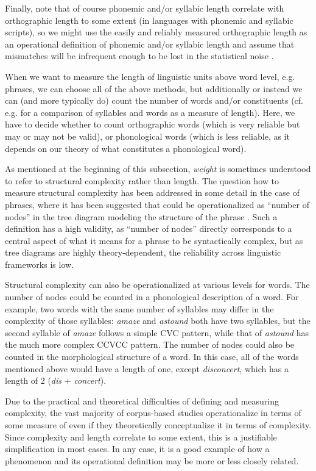 Finally, note that of course phonemic and/or syllabic length correlate with orthographic length to some extent (in languages with phonemic and syllabic scripts), so we might use the easily and reliably measured orthographic length as an operational definition of phonemic and/or syllabic length and assume that mismatches will be infrequent enough to be lost in the statistical noise \citep[cf.][]{wulff_multifactorial_2003}.

When we want to measure the length of linguistic units above word level, e.g. phrases, we can choose all of the above methods, but additionally or instead we can (and more typically do) count the number of words and/or constituents (cf. e.g. \citet{gries_multifactorial_2003} for a comparison of syllables and words as a measure of length). Here, we have to decide whether to count orthographic words (which is very reliable but may or may not be valid), or phonological words (which is less reliable, as it depends on our theory of what constitutes a phonological word).

As mentioned at the beginning of this subsection, \emph{weight} is sometimes understood to refer to structural complexity rather than length. The question how to measure structural complexity has been addressed in some detail in the case of phrases, where it has been suggested that  could be operationalized as ``number of nodes'' in the tree diagram modeling the structure of the phrase \citep[cf.][]{wasow_post-verbal_2003}. Such a definition has a high validity, as ``number of nodes'' directly corresponds to a central aspect of what it means for a phrase to be syntactically complex, but as tree diagrams are highly theory-dependent, the reliability across linguistic frameworks is low.

Structural complexity can also be operationalized at various levels for words. The number of nodes could be counted in a phonological description of a word. For example, two words with the same number of syllables may differ in the complexity of those syllables: \textit{amaze} and \textit{astound} both have two syllables, but the second syllable of \textit{amaze} follows a simple CVC pattern, while that of \textit{astound} has the much more complex CCVCC pattern. The number of nodes could also be counted in the morphological structure of a word. In this case, all of the words mentioned above would have a length of one, except \textit{disconcert}, which has a length of 2 (\textit{dis} + \textit{concert}).

Due to the practical and theoretical difficulties of defining and measuring complexity, the vast majority of corpus-based studies operationalize  in terms of some measure of  even if they theoretically conceptualize it in terms of complexity. Since complexity and length correlate to some extent, this is a justifiable simplification in most cases. In any case, it is a good example of how a phenomenon and its operational definition may be more or less closely related.

